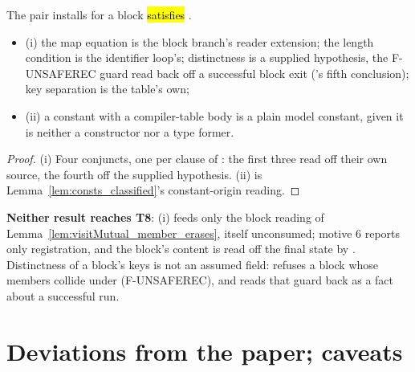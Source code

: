 \begin{lemma}
\label{lem:blockKeyed_install}
\leanok
{}
 The pair  installs for a block \hl{satisfies }.
\begin{itemize}
\item (i) the map equation is the block branch's reader extension; the length condition is the identifier
loop's; distinctness is a supplied hypothesis, the F-UNSAFEREC guard read back off a successful block
exit ('s fifth conclusion); key separation is the table's own;
\item (ii) a constant with a compiler-table body is a plain model constant, given it is neither a
constructor nor a type former.
\end{itemize}
\end{lemma}
\begin{proof}
\leanok
{}
 (i) Four conjuncts, one per clause of : the first three read off their own
source, the fourth off the supplied  hypothesis. (ii) is
Lemma~\ref{lem:consts_classified}'s constant-origin reading.
\end{proof}

\begin{remark}
 \textbf{Neither result reaches T8}: (i) feeds only the block reading of
Lemma~\ref{lem:visitMutual_member_erases}, itself unconsumed; motive 6 reports only registration, and the
block's content is read off the final state by . Distinctness of a block's
keys is not an assumed field:  refuses a block whose members collide
under  (F-UNSAFEREC), and  reads that guard back
as a fact about a successful run.
\end{remark}

\section*{Deviations from the paper; caveats}

